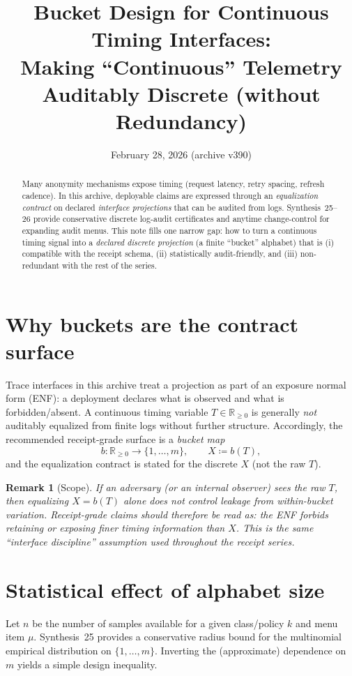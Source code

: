 \documentclass[11pt]{article}
\title{Bucket Design for Continuous Timing Interfaces:\\
\large Making ``Continuous'' Telemetry Auditably Discrete (without Redundancy)}
\author{}
\date{February 28, 2026 (archive v390)}
\newtheorem{remark}{Remark}
\begin{document}
\maketitle

\begin{abstract}
Many anonymity mechanisms expose timing (request latency, retry spacing, refresh cadence).
In this archive, deployable claims are expressed through an \emph{equalization contract} on declared
\emph{interface projections} that can be audited from logs.
Synthesis~25--26 provide conservative discrete log-audit certificates and anytime change-control for expanding audit menus.
This note fills one narrow gap: how to turn a continuous timing signal into a \emph{declared discrete projection} (a finite ``bucket'' alphabet)
that is (i) compatible with the receipt schema, (ii) statistically audit-friendly, and (iii) non-redundant with the rest of the series.
\end{abstract}

\section{Why buckets are the contract surface}
Trace interfaces in this archive treat a projection as part of an exposure normal form (ENF): a deployment declares
what is observed and what is forbidden/absent. \cite{series:traceifaces}
A continuous timing variable $T\in\mathbb{R}_{\ge 0}$ is generally \emph{not} auditably equalized from finite logs without further structure.
Accordingly, the recommended receipt-grade surface is a \emph{bucket map}
\[
b:\mathbb{R}_{\ge 0}\to\{1,\dots,m\},\qquad X \coloneqq b(T),
\]
and the equalization contract is stated for the discrete $X$ (not the raw $T$). \cite{series:profiling,series:stataudit}

\begin{remark}[Scope]
If an adversary (or an internal observer) sees the raw $T$, then equalizing $X=b(T)$ alone does not control leakage from within-bucket variation.
Receipt-grade claims should therefore be read as: \emph{the ENF forbids retaining or exposing finer timing information than $X$}.
This is the same ``interface discipline'' assumption used throughout the receipt series. \cite{series:receiptitems,series:receiptrulebook}
\end{remark}

\section{Statistical effect of alphabet size}
Let $n$ be the number of samples available for a given class/policy $k$ and menu item $\mu$.
Synthesis~25 provides a conservative radius bound for the multinomial empirical distribution on $\{1,\dots,m\}$. \cite{series:stataudit}
Inverting the (approximate) dependence on $m$ yields a simple design inequality.
\end{document}
